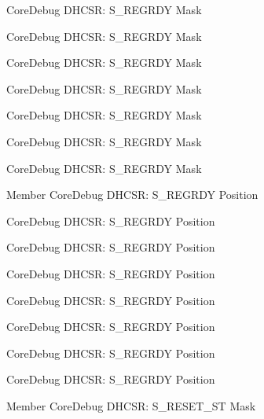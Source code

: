 \begin{DoxyRefList}
\label{deprecated__deprecated000581}%
%
Core\+Debug DHCSR\+: S\+\_\+\+REGRDY Mask 

\label{deprecated__deprecated000120}%
%
Core\+Debug DHCSR\+: S\+\_\+\+REGRDY Mask 

\label{deprecated__deprecated000392}%
%
Core\+Debug DHCSR\+: S\+\_\+\+REGRDY Mask 

\label{deprecated__deprecated000174}%
%
Core\+Debug DHCSR\+: S\+\_\+\+REGRDY Mask 

\label{deprecated__deprecated000028}%
%
Core\+Debug DHCSR\+: S\+\_\+\+REGRDY Mask 

\label{deprecated__deprecated000259}%
%
Core\+Debug DHCSR\+: S\+\_\+\+REGRDY Mask 

\label{deprecated__deprecated000479}%
%
Core\+Debug DHCSR\+: S\+\_\+\+REGRDY Mask  
\item[Member \doxylink{group__CMSIS__CoreDebug_ga20a71871ca8768019c51168c70c3f41d}{Core\+Debug\+\_\+\+DHCSR\+\_\+\+S\+\_\+\+REGRDY\+\_\+\+Pos} ]\label{deprecated__deprecated000258}%
%
Core\+Debug DHCSR\+: S\+\_\+\+REGRDY Position 

\label{deprecated__deprecated000173}%
%
Core\+Debug DHCSR\+: S\+\_\+\+REGRDY Position 

\label{deprecated__deprecated000478}%
%
Core\+Debug DHCSR\+: S\+\_\+\+REGRDY Position 

\label{deprecated__deprecated000119}%
%
Core\+Debug DHCSR\+: S\+\_\+\+REGRDY Position 

\label{deprecated__deprecated000315}%
%
Core\+Debug DHCSR\+: S\+\_\+\+REGRDY Position 

\label{deprecated__deprecated000580}%
%
Core\+Debug DHCSR\+: S\+\_\+\+REGRDY Position 

\label{deprecated__deprecated000027}%
%
Core\+Debug DHCSR\+: S\+\_\+\+REGRDY Position 

\label{deprecated__deprecated000391}%
%
Core\+Debug DHCSR\+: S\+\_\+\+REGRDY Position  
\item[Member \doxylink{group__CMSIS__CoreDebug_gac474394bcceb31a8e09566c90b3f8922}{Core\+Debug\+\_\+\+DHCSR\+\_\+\+S\+\_\+\+RESET\+\_\+\+ST\+\_\+\+Msk} ]\label{deprecated__deprecated000563}%
%
Core\+Debug DHCSR\+: S\+\_\+\+RESET\+\_\+\+ST Mask 


\end{DoxyRefList}
